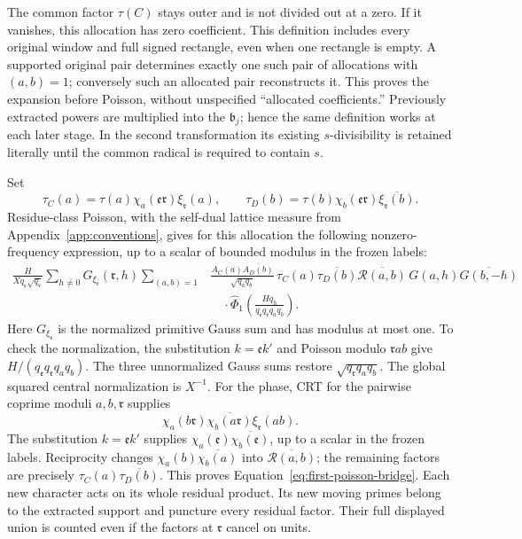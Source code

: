 \documentclass[12pt]{article}
\begin{document}
The common factor \(\tau(C)\) stays outer and is not divided out
at a zero.  If it vanishes, this allocation has zero coefficient.
This definition includes every original window and full signed
rectangle, even when one rectangle is empty.  A supported original
pair determines exactly one such pair of allocations with
\((a,b)=1\); conversely such an allocated pair reconstructs it.
This proves the expansion before Poisson, without unspecified
``allocated coefficients.''  Previously extracted powers are
multiplied into the \(\mathfrak b_j\); hence the same definition
works at each later stage.  In the second transformation its
existing \(s\)-divisibility is retained literally until the
common radical is required to contain \(s\).

Set
\[
 \tau_C(a)=\tau(a)\chi_a(\mathfrak e\mathfrak r)
                       \xi_{\mathfrak r}(a),\qquad
 \tau_D(b)=\tau(b)\chi_b(\mathfrak e\mathfrak r)
                       \overline{\xi_{\mathfrak r}(b)}.
\]
Residue-class Poisson, with the self-dual lattice measure from
Appendix~\ref{app:conventions}, gives for this allocation the following
nonzero-frequency expression, up to a scalar of bounded modulus in
the frozen labels:
\begin{equation}
 \begin{split}
 \frac{H}{Xq_{\mathfrak e}\sqrt{q_{\mathfrak r}}}
 \sum_{h\ne0}G_{\xi_{\mathfrak r}}(\mathfrak r,h)
 \sum_{(a,b)=1}
 &\frac{A_C(a)\overline{A_D(b)}}{\sqrt{q_aq_b}}\,
 \tau_C(a)\overline{\tau_D(b)}
 \overline{\mathcal R(a,b)}\,
 G(a,h)\overline{G(b,-h)}
 \\
 &\quad\cdot
 \widehat\Phi_1\left(
    \frac{Hq_h}{q_{\mathfrak e}q_{\mathfrak r}q_aq_b}
                    \right).
 \end{split}
 \label{eq:first-poisson-bridge}
\end{equation}
Here \(G_{\xi_{\mathfrak r}}\) is the normalized primitive Gauss
sum and has modulus at most one.  To check the normalization, the
substitution \(k=\mathfrak e k'\) and Poisson modulo
\(\mathfrak r ab\) give \(H/(q_{\mathfrak e}q_{\mathfrak r}q_aq_b)\).
The three unnormalized Gauss sums restore
\(\sqrt{q_{\mathfrak r}q_aq_b}\).  The global squared central
normalization is \(X^{-1}\).  For the phase, CRT for the pairwise coprime moduli
\(a,b,\mathfrak r\) supplies
\[
 \chi_a(b\mathfrak r)\overline{\chi_b(a\mathfrak r)}
       \xi_{\mathfrak r}(ab).
\]
The substitution \(k=\mathfrak e k'\) supplies
\(\chi_a(\mathfrak e)\overline{\chi_b(\mathfrak e)}\), up to a
scalar in the frozen labels.  Reciprocity changes
\(\chi_a(b)\overline{\chi_b(a)}\) into
\(\overline{\mathcal R(a,b)}\); the remaining factors are precisely
\(\tau_C(a)\overline{\tau_D(b)}\).  This proves
Equation~\eqref{eq:first-poisson-bridge}.  Each new character acts on
its whole residual product.  Its new moving primes belong to the
extracted support and puncture every residual factor.  Their full displayed
union is counted even if the factors at \(\mathfrak r\) cancel on units.
\end{document}
